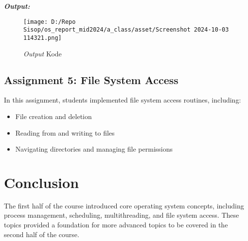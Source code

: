 \documentclass[12pt]{article}
\begin{document}
\textbf{\textit{Output:}}

\begin{figure}[h]
    \centering
    \texttt{[image: D:/Repo Sisop/os\_report\_mid2024/a\_class/asset/Screenshot 2024-10-03 114321.png]}
    \caption{\textit{Output} Kode}
\end{figure}


\subsection{Assignment 5: File System Access}
In this assignment, students implemented file system access routines, including:
\begin{itemize}
    \item File creation and deletion
    \item Reading from and writing to files
    \item Navigating directories and managing file permissions
\end{itemize}


\section{Conclusion}
The first half of the course introduced core operating system concepts, including process management, scheduling, multithreading, and file system access. These topics provided a foundation for more advanced topics to be covered in the second half of the course.
\end{document}
